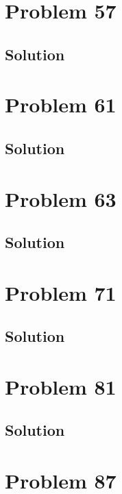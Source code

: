 \documentclass[12pt]{article}
\begin{document}
    \pagebreak
    \section{Problem 57}

        \subsection{Solution}

    \pagebreak
    \section{Problem 61}

        \subsection{Solution}

    \pagebreak
    \section{Problem 63}

        \subsection{Solution}

    \pagebreak
    \section{Problem 71}

        \subsection{Solution}

    \pagebreak
    \section{Problem 81}

        \subsection{Solution}

    \pagebreak
    \section{Problem 87}
\end{document}
